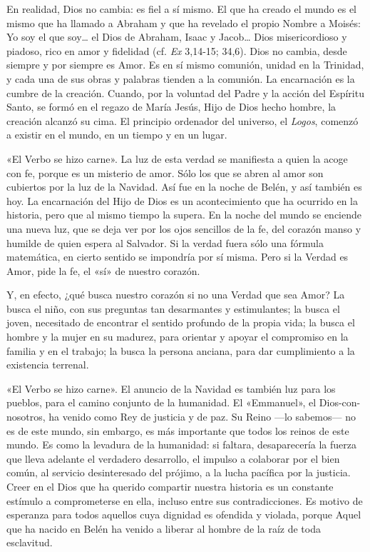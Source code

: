 En realidad, Dios no cambia: es fiel a sí mismo. El que ha creado el
mundo es el mismo que ha llamado a Abraham y que ha revelado el propio
Nombre a Moisés: Yo soy el que soy\ldots{} el Dios de Abraham, Isaac y
Jacob\ldots{} Dios misericordioso y piadoso, rico en amor y fidelidad
(cf. \emph{Ex} 3,14-15; 34,6). Dios no cambia, desde siempre y por
siempre es Amor. Es en sí mismo comunión, unidad en la Trinidad, y cada
una de sus obras y palabras tienden a la comunión. La encarnación es la
cumbre de la creación. Cuando, por la voluntad del Padre y la acción del
Espíritu Santo, se formó en el regazo de María Jesús, Hijo de Dios hecho
hombre, la creación alcanzó su cima. El principio ordenador del
universo, el \emph{Logos}, comenzó a existir en el mundo, en un tiempo y
en un lugar.

«El Verbo se hizo carne». La luz de esta verdad se manifiesta a quien la
acoge con fe, porque es un misterio de amor. Sólo los que se abren al
amor son cubiertos por la luz de la Navidad. Así fue en la noche de
Belén, y así también es hoy. La encarnación del Hijo de Dios es un
acontecimiento que ha ocurrido en la historia, pero que al mismo tiempo
la supera. En la noche del mundo se enciende una nueva luz, que se deja
ver por los ojos sencillos de la fe, del corazón manso y humilde de
quien espera al Salvador. Si la verdad fuera sólo una fórmula
matemática, en cierto sentido se impondría por sí misma. Pero si la
Verdad es Amor, pide la fe, el «sí» de nuestro corazón.

Y, en efecto, ¿qué busca nuestro corazón si no una Verdad que sea Amor?
La busca el niño, con sus preguntas tan desarmantes y estimulantes; la
busca el joven, necesitado de encontrar el sentido profundo de la propia
vida; la busca el hombre y la mujer en su madurez, para orientar y
apoyar el compromiso en la familia y en el trabajo; la busca la persona
anciana, para dar cumplimiento a la existencia terrenal.

«El Verbo se hizo carne». El anuncio de la Navidad es también luz para
los pueblos, para el camino conjunto de la humanidad. El «Emmanuel», el
Dios-con-nosotros, ha venido como Rey de justicia y de paz. Su Reino
---lo sabemos--- no es de este mundo, sin embargo, es más importante que
todos los reinos de este mundo. Es como la levadura de la humanidad: si
faltara, desaparecería la fuerza que lleva adelante el verdadero
desarrollo, el impulso a colaborar por el bien común, al servicio
desinteresado del prójimo, a la lucha pacífica por la justicia. Creer en
el Dios que ha querido compartir nuestra historia es un constante
estímulo a comprometerse en ella, incluso entre sus contradicciones. Es
motivo de esperanza para todos aquellos cuya dignidad es ofendida y
violada, porque Aquel que ha nacido en Belén ha venido a liberar al
hombre de la raíz de toda esclavitud.

